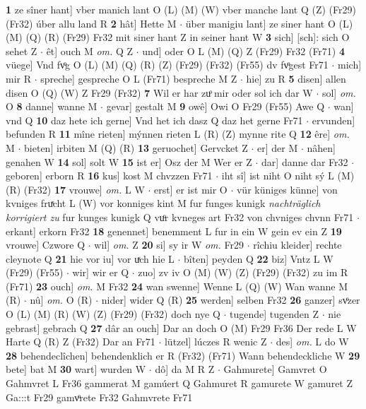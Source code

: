 \documentclass[8pt,a4paper,notitlepage]{article}
\begin{document}
\begin{table}[ht]
\begin{minipage}[t]{0.5\linewidth}
\textbf{1} ze sîner hant] vber manich lant O (L) (M) (W) vber manche lant Q (Z) (Fr29) (Fr32) úber allu land R \textbf{2} hât] Hette M  $\cdot$ über manigiu lant] ze siner hant O (L) (M) (Q) (R) (Fr29) Fr32 mit siner hant Z in seiner hant W \textbf{3} sich] [sch]: sich O sehet Z  $\cdot$ êt] ouch M \textit{om.} Q Z  $\cdot$ und] oder O L (M) (Q) Z (Fr29) Fr32 (Fr71) \textbf{4} vüege] Vnd fvͦg O (L) (M) (Q) (R) (Z) (Fr29) (Fr32) (Fr55) dv fvͦgest Fr71  $\cdot$ mich] mir R  $\cdot$ spreche] gespreche O L (Fr71) bespreche M Z  $\cdot$ hie] zu R \textbf{5} disen] allen disen O (Q) (W) Z Fr29 (Fr32) \textbf{7} Wil er har zuͦ mir oder sol ich dar W  $\cdot$ sol] \textit{om.} O \textbf{8} danne] wanne M  $\cdot$ gevar] gestalt M \textbf{9} owê] Owi O Fr29 (Fr55) Awe Q  $\cdot$ wan] vnd Q \textbf{10} daz hete ich gerne] Vnd het ich dasz Q daz het gerne Fr71  $\cdot$ ervunden] befunden R \textbf{11} mîne rieten] mýnnen rieten L (R) (Z) mynne rite Q \textbf{12} êre] \textit{om.} M  $\cdot$ bieten] irbiten M (Q) (R) \textbf{13} geruochet] Gervcket Z  $\cdot$ er] der M  $\cdot$ nâhen] genahen W \textbf{14} sol] solt W \textbf{15} ist er] Osz der M Wer er Z  $\cdot$ dar] danne dar Fr32  $\cdot$ geboren] erborn R \textbf{16} kus] kost M chvzzen Fr71  $\cdot$ iht sî] ist niht O niht sý L (M) (R) (Fr32) \textbf{17} vrouwe] \textit{om.} L W  $\cdot$ erst] er ist mir O  $\cdot$ vür küniges künne] von kvniges fruͯcht L (W) vor konniges kint M fur funges kunigk \textit{nachträglich korrigiert zu} fur kunges kunigk Q vuͦr kvneges art Fr32 von chvniges chvnn Fr71  $\cdot$ erkant] erkorn Fr32 \textbf{18} genennet] benemment L fur in ein W gein ev ein Z \textbf{19} vrouwe] Czwore Q  $\cdot$ wil] \textit{om.} Z \textbf{20} si] sy ir W \textit{om.} Fr29  $\cdot$ rîchiu kleider] rechte cleynote Q \textbf{21} hie vor iu] vor uͯch hie L  $\cdot$ bîten] peyden Q \textbf{22} biz] Vntz L W (Fr29) (Fr55)  $\cdot$ wir] wir er Q  $\cdot$ zuo] zv iv O (M) (W) (Z) (Fr29) (Fr32) zu im R (Fr71) \textbf{23} ouch] \textit{om.} M Fr32 \textbf{24} wan swenne] Wenne L (Q) (W) Wan wanne M (R)  $\cdot$ nû] \textit{om.} O (R)  $\cdot$ nider] wider Q (R) \textbf{25} werden] selben Fr32 \textbf{26} ganzer] svͦzer O (L) (M) (R) (W) (Z) (Fr29) (Fr32) doch nye Q  $\cdot$ tugende] tugenden Z  $\cdot$ nie gebrast] gebrach Q \textbf{27} dâr an ouch] Dar an doch O (M) Fr29 Fr36 Der rede L W Harte Q (R) Z (Fr32) Dar an Fr71  $\cdot$ lützel] lúczes R wenic Z  $\cdot$ des] \textit{om.} L do W \textbf{28} behendeclîchen] behendenklich er R (Fr32) (Fr71) Wann behendeckliche W \textbf{29} bete] bat M \textbf{30} wart] wurden W  $\cdot$ dô] da M R Z  $\cdot$ Gahmurete] Gamvret O Gahmvret L Fr36 gammerat M gamúert Q Gahmuret R gamurete W gamuret Z Ga:::t Fr29 gamvͦrete Fr32 Gahmvrete Fr71 \newline

\end{minipage}
\end{table}
\end{document}

